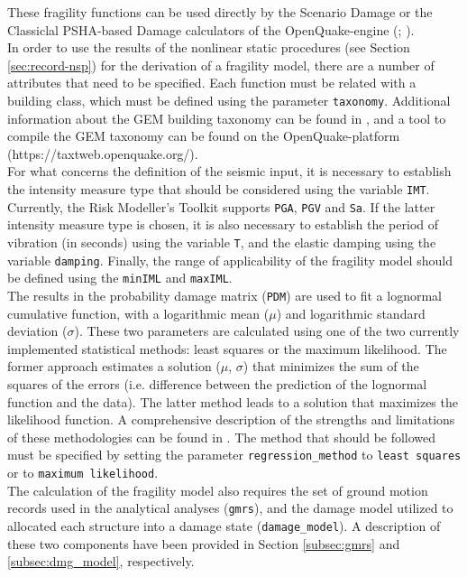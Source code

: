 These fragility functions can be used directly by the Scenario Damage or the Classiclal PSHA-based Damage calculators of the OpenQuake-engine (\cite{SilvaEtAl2014a}; \cite{PaganiEtAl2014a}). \\

In order to use the results of the nonlinear static procedures (see Section \ref{sec:record-nsp}) for the derivation of a fragility model, there are a number of attributes that need to be specified. Each function must be related with a building class, which must be defined using the parameter \verb=taxonomy=. Additional information about the GEM building taxonomy can be found in \cite{BrzevEtAl2013}, and a tool to compile the GEM taxonomy can be found on the OpenQuake-platform (https://taxtweb.openquake.org/).\\

For what concerns the definition of the seismic input, it is necessary to establish the intensity measure type that should be considered using the variable \verb=IMT=. Currently, the Risk Modeller's Toolkit supports \verb=PGA=, \verb=PGV= and \verb=Sa=. If the latter intensity measure type is chosen, it is also necessary to establish the period of vibration (in seconds) using the variable \verb=T=, and the elastic damping using the variable \verb=damping=. Finally, the range of applicability of the fragility model should be defined using the \verb=minIML= and \verb=maxIML=.  \\

The results in the probability damage matrix (\verb=PDM=) are used to fit a lognormal cumulative function, with a logarithmic mean ($\mu$) and logarithmic standard deviation ($\sigma$). These two parameters are calculated using one of the two currently implemented statistical methods: least squares or the maximum likelihood. The former approach estimates a solution ($\mu$, $\sigma$) that minimizes the sum of the squares of the errors (i.e. difference between the prediction of the lognormal function and the data). The latter method leads to a solution that maximizes the likelihood function. A comprehensive description of the strengths and limitations of these methodologies can be found in \cite{LallemantEtAl2015}. The method that should be followed must be specified by setting the parameter \verb=regression_method= to \verb=least squares= or to \verb=maximum likelihood=.\\

The calculation of the fragility model also requires the set of ground motion records used in the analytical analyses (\verb=gmrs=), and the damage model utilized to allocated each structure into a damage state (\verb=damage_model=). A description of these two components have been provided in Section \ref{subsec:gmrs} and \ref{subsec:dmg_model}, respectively.\\

